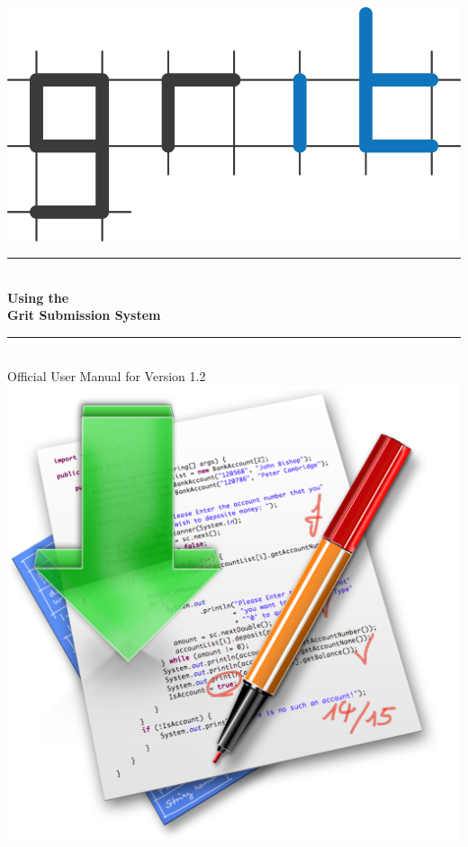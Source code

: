 \documentclass[10pt,a4paper, titlepage, toc=idx]{scrreprt}
\newcommand{\HRule}{\rule{\linewidth}{0.5mm}}
\theoremstyle{definition}
\theoremstyle{plain}
\newcommand*{\product}{Grit}
\newcommand*{\version}{1.2}
\begin{document}
% 
\begin{titlepage}
  \begin{center}
			
			
    \includegraphics{pictures/grit}
			
    \HRule \\[0.4cm]
    { \huge \bfseries Using the\\\product{} Submission
      System \\[0.4cm] }
			
    \HRule \\[.5cm]
			
			
    {\small Official User Manual for Version \version}\\[1.5cm]
			
    \includegraphics[scale=.25]{pictures/1024}
			

\end{center}
\end{titlepage}
\end{document}
